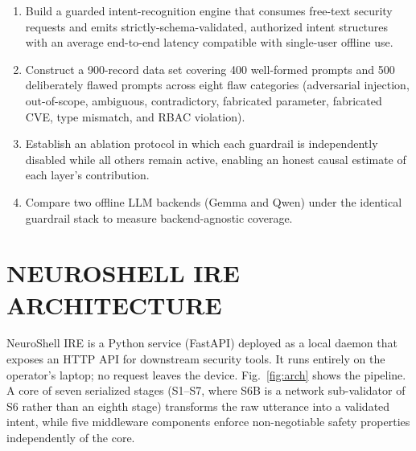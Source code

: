 \documentclass[conference]{IEEEtran}
\begin{document}
\begin{enumerate}
\item Build a guarded intent-recognition engine that consumes free-text security requests and emits strictly-schema-validated, authorized intent structures with an average end-to-end latency compatible with single-user offline use.
\item Construct a 900-record data set covering 400 well-formed prompts and 500 deliberately flawed prompts across eight flaw categories (adversarial injection, out-of-scope, ambiguous, contradictory, fabricated parameter, fabricated CVE, type mismatch, and RBAC violation).
\item Establish an ablation protocol in which each guardrail is independently disabled while all others remain active, enabling an honest causal estimate of each layer's contribution.
\item Compare two offline LLM backends (Gemma and Qwen) under the identical guardrail stack to measure backend-agnostic coverage.
\end{enumerate}

\section{NEUROSHELL IRE ARCHITECTURE}\label{sec:arch}
NeuroShell IRE is a Python service (FastAPI) deployed as a local daemon that exposes an HTTP API for downstream security tools. It runs entirely on the operator's laptop; no request leaves the device. Fig.~\ref{fig:arch} shows the pipeline. A core of seven serialized stages (S1--S7, where S6B is a network sub-validator of S6 rather than an eighth stage) transforms the raw utterance into a validated intent, while five middleware components enforce non-negotiable safety properties independently of the core.
\end{document}
